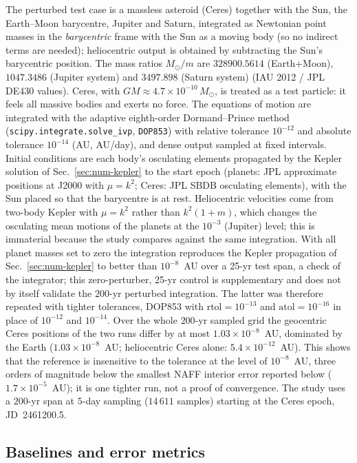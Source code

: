The perturbed test case is a massless asteroid (Ceres) together with the Sun,
the Earth--Moon barycentre, Jupiter and Saturn, integrated as Newtonian point
masses in the \emph{barycentric} frame with the Sun as a moving body (so no
indirect terms are needed); heliocentric output is obtained by subtracting the
Sun's barycentric position. The mass ratios $M_\odot/m$ are $328900.5614$
(Earth+Moon), $1047.3486$ (Jupiter system) and $3497.898$ (Saturn system)
(IAU 2012 / JPL DE430 values). Ceres, with $GM\approx4.7\times10^{-10}\,M_\odot$,
is treated as a test particle: it feels all massive bodies and exerts no force.
The equations of motion are integrated with the adaptive eighth-order
Dormand--Prince method (\texttt{scipy.integrate.solve\_ivp}, \texttt{DOP853})
with relative tolerance $10^{-12}$ and absolute tolerance $10^{-14}$ (AU,
AU/day), and dense output sampled at fixed intervals. Initial conditions are
each body's osculating elements propagated by the Kepler solution of
Sec.~\ref{sec:num-kepler} to the start epoch (planets: JPL approximate
positions at J2000 with $\mu=k^2$; Ceres: JPL SBDB osculating elements), with
the Sun placed so that the barycentre is at rest. Heliocentric velocities come
from two-body Kepler with $\mu=k^2$ rather than $k^2(1+m)$, which changes the
osculating mean motions of the planets at the $10^{-3}$ (Jupiter) level; this is
immaterial because the study compares against the same integration. With all
planet masses set to zero the integration reproduces the Kepler propagation of
Sec.~\ref{sec:num-kepler} to better than $10^{-8}$~AU over a 25-yr test span, a check of the
integrator; this zero-perturber, 25-yr control is supplementary and does not by
itself validate the $200$-yr perturbed integration. The latter was therefore
repeated with tighter tolerances, DOP853 with $\mathrm{rtol}=10^{-13}$ and
$\mathrm{atol}=10^{-16}$ in place of $10^{-12}$ and $10^{-14}$. Over the whole
$200$-yr sampled grid the geocentric Ceres positions of the two runs differ by at
most $1.03\times10^{-8}$~AU, dominated by the Earth ($1.03\times10^{-8}$~AU;
heliocentric Ceres alone: $5.4\times10^{-12}$~AU). This shows that the reference
is insensitive to the tolerance at the level of $10^{-8}$~AU, three orders of
magnitude below the smallest NAFF interior error reported below
($1.7\times10^{-5}$~AU); it is one tighter run, not a proof of convergence. The study uses a $200$-yr span at $5$-day sampling ($14\,611$
samples) starting at the Ceres epoch, JD~2461200.5.

\subsection{Baselines and error metrics}
\label{sec:num-baselines}

